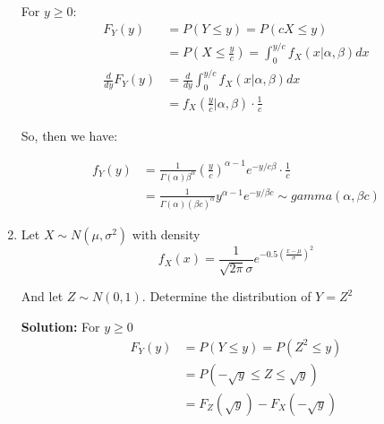\documentclass{article}
\begin{document}
\begin{enumerate}
    For $y \geq 0$:
    \begin{equation*}
        \begin{split}
            F_Y(y) &= P(Y \leq y) = P(cX \leq y)\\
            &= P\left(X \leq \frac{y}{c}\right) = \int_0^{y/c} f_X(x|\alpha,\beta)dx\\
            \frac{d}{dy} F_Y(y) &= \frac{d}{dy} \int_0^{y/c} f_X(x|\alpha,\beta)dx\\
            &= f_X\left(\frac{y}{c} | \alpha,\beta\right) \cdot \frac{1}{c}
        \end{split}
    \end{equation*}
    
    So, then we have:
    
    \begin{equation*}
    \begin{split}
        f_Y(y) &= \frac{1}{\Gamma(\alpha)\beta^\alpha} \left(\frac{y}{c}\right)^{\alpha-1} e^{-y/c\beta} \cdot \frac{1}{c}\\
        &= \frac{1}{\Gamma(\alpha)(\beta c)^\alpha} y^{\alpha-1} e^{-y/\beta c} \sim gamma(\alpha, \beta c)
    \end{split}
    \end{equation*}
    
    \item Let $X \sim N(\mu, \sigma^2)$ with density
    \begin{equation*}
        f_X(x) = \frac{1}{\sqrt{2\pi}\sigma} e^{-0.5\left(\frac{x-\mu}{\sigma}\right)^2}
    \end{equation*}
    
    And let $Z \sim N(0,1)$. Determine the distribution of $Y = Z^2$
    
    \textbf{Solution:} For $y \geq 0$
    \begin{equation*}
        \begin{split}
            F_Y(y) &= P(Y \leq y) = P(Z^2 \leq y)\\
            &= P(-\sqrt{y} \leq Z \leq \sqrt{y})\\
            &= F_Z(\sqrt{y}) - F_X(-\sqrt{y})
        \end{split}
    \end{equation*}
    

\end{enumerate}
\end{document}
